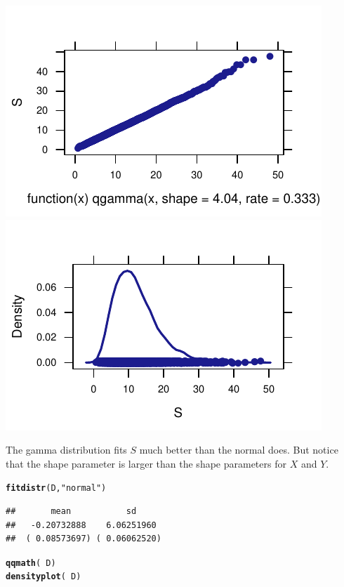 \documentclass[twoside]{book}\usepackage[]{graphicx}\usepackage[]{xcolor}
\makeatletter
\def\maxwidth{ %
  \ifdim\Gin@nat@width>\linewidth
    \linewidth
  \else
    \Gin@nat@width
  \fi
}
\newcommand{\hlstr}[1]{\textcolor[rgb]{0.192,0.494,0.8}{#1}}%
\newcommand{\hlopt}[1]{\textcolor[rgb]{0,0,0}{#1}}%
\newcommand{\hlstd}[1]{\textcolor[rgb]{0.345,0.345,0.345}{#1}}%
\newcommand{\hlkwd}[1]{\textcolor[rgb]{0.737,0.353,0.396}{\textbf{#1}}}%
\newenvironment{kframe}{%
 \def\at@end@of@kframe{}%
 \ifinner\ifhmode%
  \def\at@end@of@kframe{\end{minipage}}%
  \begin{minipage}{\columnwidth}%
 \fi\fi%
 \def\FrameCommand##1{\hskip\@totalleftmargin \hskip-\fboxsep
 \colorbox{shadecolor}{##1}\hskip-\fboxsep
     \hskip-\linewidth \hskip-\@totalleftmargin \hskip\columnwidth}%
 \MakeFramed {\advance\hsize-\width
   \@totalleftmargin\z@ \linewidth\hsize
   \@setminipage}}%
 {\par\unskip\endMakeFramed%
 \at@end@of@kframe}
\newenvironment{knitrout}{}{} %
\makeatother
\begin{document}
\begin{solution}
\begin{knitrout}
{\centering \includegraphics[width=\maxwidth]{figures/fig-unnamed-chunk-139-1} 
\includegraphics[width=\maxwidth]{figures/fig-unnamed-chunk-139-2} 

}



\end{knitrout}
The gamma distribution fits $S$ much better than the normal does.  But notice that the 
shape parameter is larger than the shape parameters for $X$ and $Y$.

\begin{knitrout}
\color{fgcolor}\begin{kframe}
\begin{alltt}
\hlkwd{fitdistr}\hlstd{(D,} \hlstr{"normal"}\hlstd{)}
\end{alltt}
\begin{verbatim}
##       mean           sd     
##   -0.20732888    6.06251960 
##  ( 0.08573697) ( 0.06062520)
\end{verbatim}
\begin{alltt}
\hlkwd{qqmath}\hlstd{(}\hlopt{~}\hlstd{D)}
\hlkwd{densityplot}\hlstd{(}\hlopt{~}\hlstd{D)}
\end{alltt}
\end{kframe}


\end{knitrout}
\end{solution}
\end{document}
